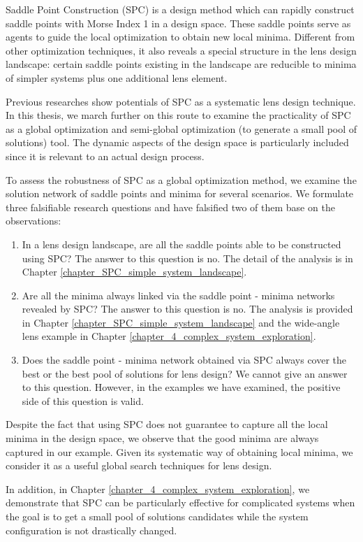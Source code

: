 Saddle Point Construction (SPC) is a design method which can rapidly construct saddle points with Morse Index 1 in a design space. These saddle points serve as agents to guide the local optimization to obtain new local minima. Different from other optimization techniques, it also reveals a special structure in the lens design landscape: certain saddle points existing in the landscape are reducible to minima of simpler systems plus one additional lens element.

Previous researches show potentials of SPC as a systematic lens design technique. In this thesis, we march further on this route to examine the practicality of SPC as a global optimization and semi-global optimization (to generate a small pool of solutions) tool. The dynamic aspects of the design space is particularly included since it is relevant to an actual design process. 

To assess the robustness of SPC as a global optimization method, we examine the solution network of saddle points and minima for several scenarios. We formulate three falsifiable research questions and have falsified two of them base on the observations:
\begin{enumerate}[nosep]
\item In a lens design landscape, are all the saddle points able to be constructed using SPC? The answer to this question is no. The detail of the analysis is in Chapter \ref{chapter_SPC_simple_system_landscape}.
\item Are all the minima always linked via the saddle point - minima networks revealed by SPC? The answer to this question is no. The analysis is provided in Chapter \ref{chapter_SPC_simple_system_landscape} and the wide-angle lens example in Chapter \ref{chapter_4_complex_system_exploration}.
\item Does the saddle point - minima network obtained via SPC always cover the best or the best pool of solutions for lens design? We cannot give an answer to this question. However, in the examples we have examined, the positive side of this question is valid. 
\end{enumerate}

Despite the fact that using SPC does not guarantee to capture all the local minima in the design space, we observe that the good minima are always captured in our example. Given its systematic way of obtaining local minima, we consider it as a useful global search techniques for lens design. 

In addition, in Chapter \ref{chapter_4_complex_system_exploration}, we demonstrate that SPC can be particularly effective for complicated systems when the goal is to get a small pool of solutions candidates while the system configuration is not drastically changed. 

